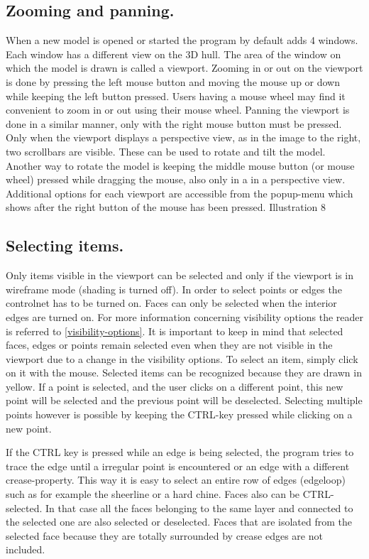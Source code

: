 \documentclass[12pt]{article}
\begin{document}
\subsection{Zooming and panning.}
When a new model is opened or started the program by default adds 4
windows. Each window has a different view on the 3D hull. The area of
the window on which the model is drawn is called a viewport. Zooming
in or out on the viewport is done by pressing the left mouse button
and moving the mouse up or down while keeping the left button pressed.
Users having a mouse wheel may find it convenient to zoom in or out
using their mouse wheel. Panning the viewport is done in a similar
manner, only with the right mouse button must be pressed. Only when
the viewport displays a perspective view, as in the image to the
right, two scrollbars are visible. These can be used to rotate and
tilt the model. Another way to rotate the model is keeping the middle
mouse button (or mouse wheel) pressed while dragging the mouse, also
only in a in a perspective view. Additional options for each viewport
are accessible from the popup-menu which shows after the right button
of the mouse has been pressed.
Illustration 8

\subsection{Selecting items.}
Only items visible in the viewport can be selected and only if the
viewport is in wireframe mode (shading is turned off). In order to
select points or edges the controlnet has to be turned on. Faces can
only be selected when the interior edges are turned on. For more
information concerning visibility options the reader is referred
to \ref{visibility-options}. It is important to keep in mind that
selected faces, edges or points remain selected even when they are not
visible in the viewport due to a change in the visibility options. To
select an item, simply click on it with the mouse. Selected items can
be recognized because they are drawn in yellow. If a point is
selected, and the user clicks on a different point, this new point
will be selected and the previous point will be deselected.  Selecting
multiple points however is possible by keeping the CTRL-key pressed
while clicking on a new point.

If the CTRL key is pressed while an edge is being selected, the
program tries to trace the edge until a irregular point is encountered
or an edge with a different crease-property. This way it is easy to
select an entire row of edges (edgeloop) such as for example the
sheerline or a hard chine.  Faces also can be CTRL-selected. In that
case all the faces belonging to the same layer and connected to the
selected one are also selected or deselected. Faces that are isolated
from the selected face because they are totally surrounded by crease
edges are not included.
\end{document}
